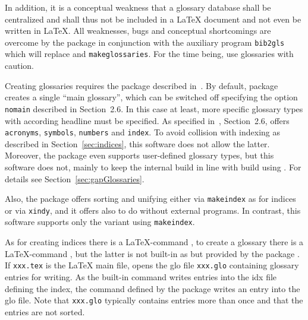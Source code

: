 In addition, it is a conceptual weakness that a glossary database 
shall be centralized and shall thus not be included in a \LaTeX{} document 
and not even be written in \LaTeX. 
All weaknesses, bugs and conceptual shortcomings are overcome 
by the package  in conjunction with the auxiliary program \texttt{bib2gls} 
which will replace  and \texttt{makeglossaries}. 
For the time being, use glossaries with caution. 
\medskip


Creating glossaries 
requires the package  described in~\cite{GloP4_54}. 
By default, package  creates a single ``main glossary'', 
which can be switched off specifying the option \texttt{nomain} 
described in Section~2.6. 
In this case at least, more specific glossary types with according headline must be specified. 
As specified in~\cite{GloP4_54}, Section~2.6, 
 offers \texttt{acronyms}, \texttt{symbols},
\texttt{numbers} and \texttt{index}. 
To avoid collision with indexing as described in Section~\ref{sec:indices}, 
this software does not allow the latter. 
Moreover, the package  even supports user-defined glossary types, 
but this software does not, 
mainly to keep the internal build in line with build using . 
For details see Section~\ref{sec:gapGlossaries}. 

Also, the package  offers sorting and unifying 
either via \texttt{makeindex} as for indices or via \texttt{xindy}, 
and it offers also to do without external programs. 
In contrast, this software supports only the variant using \texttt{makeindex}. 





As for creating indices there is a \LaTeX-command , 
to create a glossary there is a \LaTeX-command , 
but the latter is not built-in as  
but provided by the package . 
If \texttt{xxx.tex} is the \LaTeX{} main file, 
 opens the glo file \texttt{xxx.glo} 
containing glossary entries for writing. 
As the built-in command  
writes entries into the \gls{idx} file defining the index, 
the command  defined by the package  
writes an entry into the glo file. 
Note that \texttt{xxx.glo} typically contains entries more than once 
and that the entries are not sorted. 

